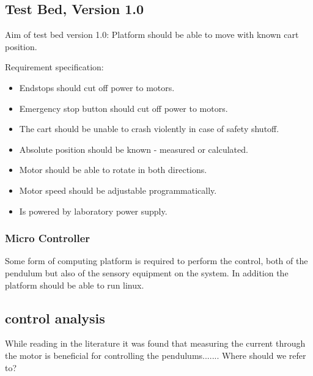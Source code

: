 


\subsection{Test Bed, Version 1.0}

Aim of test bed version 1.0: Platform should be able to move with known cart position.


Requirement specification:

\begin{itemize}
	\item Endstops should cut off power to motors.
	\item Emergency stop button should cut off power to motors.
	\item The cart should be unable to crash violently in case of safety shutoff.
	\item Absolute position should be known - measured or calculated.
	\item Motor should be able to rotate in both directions.	
	\item Motor speed should be adjustable programmatically.
	\item Is powered by laboratory power supply.
\end{itemize}

\subsubsection{Micro Controller}
Some form of computing platform is required to perform the control, both of the pendulum but also of the sensory equipment on the system.
In addition the platform should be able to run linux.


\subsection{control analysis} %
\label{sub:control_analysis}
While reading in the literature it was found that measuring the current through the motor is beneficial for controlling the pendulums....... Where should we refer to?

